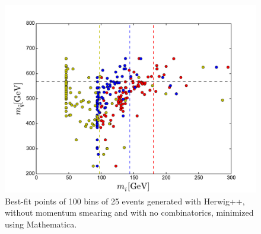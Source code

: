 \documentclass[twoside,english]{uiofysmaster}
\begin{document}
\begin{figure}[hbt]
\centering
\includegraphics[scale=0.7]{figures/herwig_mathematica_no_smearing.pdf} 
\caption{Best-fit points of 100 bins of 25 events generated with {\ttfamily Herwig++}, without momentum smearing and with no combinatorics, minimized using Mathematica.}
\label{fig:no_combinatorics_best_fit}
\end{figure}




\end{document}
